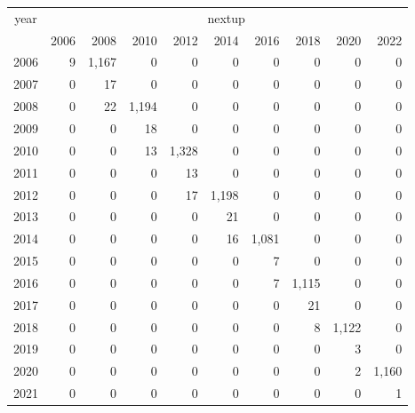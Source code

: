 \footnotesize\begin{tabular}[t]{lrrrrrrrrr}
\toprule
\multicolumn{1}{c}{year} & \multicolumn{9}{c}{nextup} \\
\cmidrule(l{3pt}r{3pt}){1-1} \cmidrule(l{3pt}r{3pt}){2-10}
  & 2006 & 2008 & 2010 & 2012 & 2014 & 2016 & 2018 & 2020 & 2022\\
\midrule
2006 & 9 & 1,167 & 0 & 0 & 0 & 0 & 0 & 0 & 0\\
2007 & 0 & 17 & 0 & 0 & 0 & 0 & 0 & 0 & 0\\
2008 & 0 & 22 & 1,194 & 0 & 0 & 0 & 0 & 0 & 0\\
2009 & 0 & 0 & 18 & 0 & 0 & 0 & 0 & 0 & 0\\
2010 & 0 & 0 & 13 & 1,328 & 0 & 0 & 0 & 0 & 0\\
2011 & 0 & 0 & 0 & 13 & 0 & 0 & 0 & 0 & 0\\
2012 & 0 & 0 & 0 & 17 & 1,198 & 0 & 0 & 0 & 0\\
2013 & 0 & 0 & 0 & 0 & 21 & 0 & 0 & 0 & 0\\
2014 & 0 & 0 & 0 & 0 & 16 & 1,081 & 0 & 0 & 0\\
2015 & 0 & 0 & 0 & 0 & 0 & 7 & 0 & 0 & 0\\
2016 & 0 & 0 & 0 & 0 & 0 & 7 & 1,115 & 0 & 0\\
2017 & 0 & 0 & 0 & 0 & 0 & 0 & 21 & 0 & 0\\
2018 & 0 & 0 & 0 & 0 & 0 & 0 & 8 & 1,122 & 0\\
2019 & 0 & 0 & 0 & 0 & 0 & 0 & 0 & 3 & 0\\
2020 & 0 & 0 & 0 & 0 & 0 & 0 & 0 & 2 & 1,160\\
2021 & 0 & 0 & 0 & 0 & 0 & 0 & 0 & 0 & 1\\
\bottomrule
\end{tabular}

